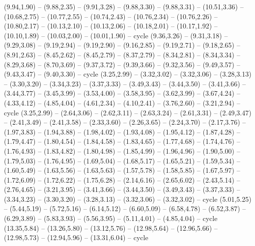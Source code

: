 \expandafter\def\csname geo:gebiet:AL\endcsname{
  (9.94,1.90) -- (9.88,2.35) -- (9.91,3.28) -- (9.88,3.30) -- (9.88,3.31) -- (10.51,3.36) -- (10.68,2.75) -- (10.77,2.55) -- (10.74,2.43) -- (10.76,2.34) -- (10.76,2.26) -- (10.80,2.17) -- (10.13,2.10) -- (10.13,2.06) -- (10.18,2.01) -- (10.17,1.92) -- (10.10,1.89) -- (10.03,2.00) -- (10.01,1.90) -- cycle}
\expandafter\def\csname geo:gebiet:AR\endcsname{
  (9.36,3.26) -- (9.31,3.18) -- (9.29,3.08) -- (9.19,2.94) -- (9.19,2.90) -- (9.16,2.85) -- (9.19,2.71) -- (9.18,2.65) -- (8.91,2.63) -- (8.45,2.62) -- (8.45,2.79) -- (8.37,2.79) -- (8.34,2.81) -- (8.34,3.34) -- (8.29,3.68) -- (8.70,3.69) -- (9.37,3.72) -- (9.39,3.66) -- (9.32,3.56) -- (9.49,3.57) -- (9.43,3.47) -- (9.40,3.30) -- cycle}
\expandafter\def\csname geo:gebiet:AZ\endcsname{
  (3.25,2.99) -- (3.32,3.02) -- (3.32,3.06) -- (3.28,3.13) -- (3.30,3.20) -- (3.34,3.23) -- (3.37,3.33) -- (3.49,3.43) -- (3.44,3.50) -- (3.41,3.66) -- (3.44,3.77) -- (3.45,3.99) -- (3.53,4.00) -- (3.58,3.95) -- (3.62,3.99) -- (3.67,4.24) -- (4.33,4.12) -- (4.85,4.04) -- (4.61,2.34) -- (4.10,2.41) -- (3.76,2.60) -- (3.21,2.94) -- cycle}
\expandafter\def\csname geo:gebiet:CA\endcsname{
  (3.25,2.99) -- (2.64,3.06) -- (2.62,3.11) -- (2.63,3.24) -- (2.61,3.31) -- (2.49,3.47) -- (2.41,3.49) -- (2.41,3.58) -- (2.33,3.60) -- (2.26,3.65) -- (2.24,3.70) -- (2.17,3.76) -- (1.97,3.83) -- (1.94,3.88) -- (1.98,4.02) -- (1.93,4.08) -- (1.95,4.12) -- (1.87,4.28) -- (1.79,4.47) -- (1.80,4.54) -- (1.84,4.58) -- (1.83,4.65) -- (1.77,4.68) -- (1.74,4.76) -- (1.76,4.93) -- (1.83,4.82) -- (1.80,4.98) -- (1.85,4.99) -- (1.96,4.96) -- (1.90,5.00) -- (1.79,5.03) -- (1.76,4.95) -- (1.69,5.04) -- (1.68,5.17) -- (1.65,5.21) -- (1.59,5.34) -- (1.60,5.49) -- (1.63,5.56) -- (1.63,5.63) -- (1.57,5.78) -- (1.58,5.85) -- (1.67,5.97) -- (1.72,6.09) -- (1.72,6.22) -- (1.75,6.28) -- (2.14,6.16) -- (2.65,6.02) -- (2.43,5.14) -- (2.76,4.65) -- (3.21,3.95) -- (3.41,3.66) -- (3.44,3.50) -- (3.49,3.43) -- (3.37,3.33) -- (3.34,3.23) -- (3.30,3.20) -- (3.28,3.13) -- (3.32,3.06) -- (3.32,3.02) -- cycle}
\expandafter\def\csname geo:gebiet:CO\endcsname{
  (5.01,5.25) -- (5.44,5.19) -- (5.72,5.16) -- (6.14,5.12) -- (6.60,5.09) -- (6.58,4.78) -- (6.52,3.87) -- (6.29,3.89) -- (5.83,3.93) -- (5.56,3.95) -- (5.11,4.01) -- (4.85,4.04) -- cycle}
\expandafter\def\csname geo:gebiet:CT\endcsname{
  (13.35,5.84) -- (13.26,5.80) -- (13.12,5.76) -- (12.98,5.64) -- (12.96,5.66) -- (12.98,5.73) -- (12.94,5.96) -- (13.31,6.04) -- cycle}
